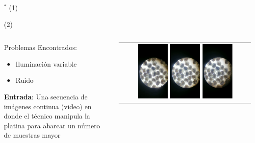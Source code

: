 \begin{frame}{$^*$  (1)}
\end{frame}


\begin{frame}{ (2)}
\begin{columns}
\begin{column}{0.38\textwidth}
Problemas Encontrados:
\begin{itemize}
        \item Iluminación variable
        \item Ruido
	\end{itemize}
\textbf{Entrada}: Una secuencia de imágenes continua (video) en donde el técnico manipula la platina para abarcar un número de muestras mayor
\end{column}
\begin{column}{0.64\textwidth}  
\begin{center}
     \begin{tabular}{c}
         \includegraphics[width=0.24\textwidth]{2022_ConteoOstioncitos/figs/R0078.png}
         \includegraphics[width=0.24\textwidth]{2022_ConteoOstioncitos/figs/R0090.png}
         \includegraphics[width=0.24\textwidth]{2022_ConteoOstioncitos/figs/R0102.png}

\end{tabular}
\end{center}
\end{column}
\end{columns}
\end{frame}
